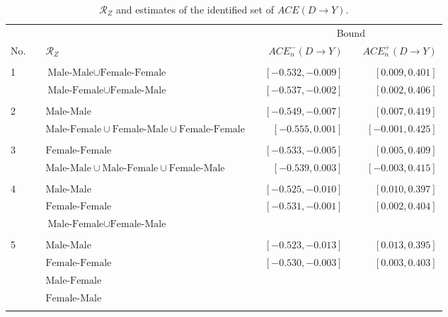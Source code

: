 \documentclass[12pt,a4paper,twoside]{article}
\renewcommand{\baselinestretch}{1.5}
\numberwithin{equation}{section}
\begin{document}
\clearpage
\renewcommand{\baselinestretch}{1}
\begin{sidewaystable}[p]
\centering
\caption{$\mathcal{R}_Z$ and estimates of the identified set of $ACE(D\rightarrow Y)$.}
\begin{tabular}{lclcrcr}
\toprule
&	&  & &\multicolumn{3}{c}{Bound} \\
\cmidrule(r){4-7}	
No.& &	$\mathcal{R}_Z$	&	&	$ACE_n^-(D\rightarrow Y)$	&	&	$ACE_n^+(D\rightarrow Y)$\\
\midrule
& &\phantom{$\text{Male-Female}\cup\text{Female-Male}\cup\text{Female-Female}$}\\
1& &$\text{Male-Male}\cup\text{Female-Female}$	&	&	$[-0.532,-0.009]$	&	&	$[0.009,0.401]$	\\
& &$\text{Male-Female}\cup\text{Female-Male}$	&	&	\color{blue}$[-0.537,-0.002]$	&	&	\color{blue}$[0.002,0.406]$	\\
\\
2& &$\text{Male-Male}$	&	&	$[-0.549,-0.007]$	&	&	$[0.007,0.419]$	\\
& &$\text{Male-Female}\cup\text{Female-Male}\cup\text{Female-Female}$	&	&	\color{blue}$[-0.555,0.001]$	&	&	\color{blue}$[-0.001,0.425]$\\
\\
3& &$\text{Female-Female}$	&	&	$[-0.533,-0.005]$	&	&	$[0.005,0.409]$	\\
& &$\text{Male-Male}\cup\text{Male-Female}\cup\text{Female-Male}$	& &\color{blue}$[-0.539,0.003]$	&	&	\color{blue}$[-0.003,0.415]$\\	
\\
4& &$\text{Male-Male}$&	&	$[-0.525,-0.010]$	&	&	$[0.010,0.397]$	\\
& &$\text{Female-Female}$ & &\color{blue}$[-0.531,-0.001]$	&	&	\color{blue}$[0.002,0.404]$\\
& &$\text{Male-Female}\cup\text{Female-Male}$\\	
\\
5& &$\text{Male-Male}$&	&	$[-0.523,-0.013]$	&	&	$[0.013,0.395]$	\\
& &$\text{Female-Female}$& &\color{blue}$[-0.530,-0.003]$	&	&	\color{blue}$[0.003,0.403]$	\\
& &$\text{Male-Female}$ \\
& &$\text{Female-Male}$\\	
	\\
\bottomrule
\end{tabular}
\vspace{10pt}

\end{sidewaystable}
\end{document}

